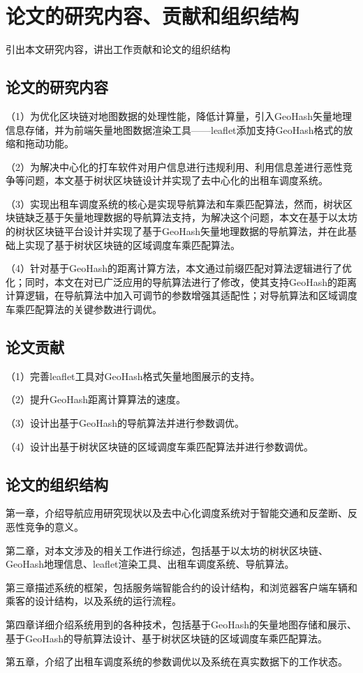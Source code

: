 \section{论文的研究内容、贡献和组织结构}
引出本文研究内容，讲出工作贡献和论文的组织结构
\subsection{论文的研究内容}
（1）为优化区块链对地图数据的处理性能，降低计算量，引入GeoHash矢量地理信息存储，并为前端矢量地图数据渲染工具——leaflet添加支持GeoHash格式的放缩和拖动功能。\par
（2）为解决中心化的打车软件对用户信息进行违规利用、利用信息差进行恶性竞争等问题，本文基于树状区块链设计并实现了去中心化的出租车调度系统。\par
（3）实现出租车调度系统的核心是实现导航算法和车乘匹配算法，然而，树状区块链缺乏基于矢量地理数据的导航算法支持，为解决这个问题，本文在基于以太坊的树状区块链平台设计并实现了基于GeoHash矢量地理数据的导航算法，并在此基础上实现了基于树状区块链的区域调度车乘匹配算法。\par
（4）针对基于GeoHash的距离计算方法，本文通过前缀匹配对算法逻辑进行了优化；同时，本文在对已广泛应用的导航算法进行了修改，使其支持GeoHash的距离计算逻辑，在导航算法中加入可调节的参数增强其适配性；对导航算法和区域调度车乘匹配算法的关键参数进行调优。
\subsection{论文贡献}
（1）完善leaflet工具对GeoHash格式矢量地图展示的支持。\par
（2）提升GeoHash距离计算算法的速度。\par
（3）设计出基于GeoHash的导航算法并进行参数调优。\par
（4）设计出基于树状区块链的区域调度车乘匹配算法并进行参数调优。
\subsection{论文的组织结构}
第一章，介绍导航应用研究现状以及去中心化调度系统对于智能交通和反垄断、反恶性竞争的意义。\par
第二章，对本文涉及的相关工作进行综述，包括基于以太坊的树状区块链、GeoHash地理信息、leaflet渲染工具、出租车调度系统、导航算法。\par
第三章描述系统的框架，包括服务端智能合约的设计结构，和浏览器客户端车辆和乘客的设计结构，以及系统的运行流程。\par
第四章详细介绍系统用到的各种技术，包括基于GeoHash的矢量地图存储和展示、基于GeoHash的导航算法设计、基于树状区块链的区域调度车乘匹配算法。\par
第五章，介绍了出租车调度系统的参数调优以及系统在真实数据下的工作状态。
